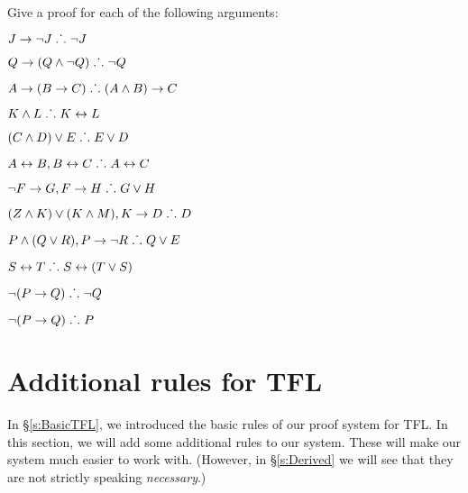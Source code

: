 \solutions
\problempart
\label{pr.solvedTFLproofs}
Give a proof for each of the following arguments:
\begin{earg}
\item $J\rightarrow\neg J \mathrel{\ldotp\dot{}\,\ldotp} \neg J$
\item $Q\rightarrow(Q\wedge\neg Q) \mathrel{\ldotp\dot{}\,\ldotp} \neg Q$
\item $A\rightarrow (B\rightarrow C) \mathrel{\ldotp\dot{}\,\ldotp} (A\wedge B)\rightarrow C$
\item $K\wedge L \mathrel{\ldotp\dot{}\,\ldotp} K\leftrightarrow L$
\item $(C\wedge D)\vee E \mathrel{\ldotp\dot{}\,\ldotp} E\vee D$
\item $A\leftrightarrow B, B\leftrightarrow C \mathrel{\ldotp\dot{}\,\ldotp} A\leftrightarrow C$
\item $\neg F\rightarrow G, F\rightarrow H \mathrel{\ldotp\dot{}\,\ldotp} G\vee H$
\item $(Z\wedge K) \vee (K\wedge M), K \rightarrow D \mathrel{\ldotp\dot{}\,\ldotp} D$
\item $P \wedge (Q\vee R), P\rightarrow \neg R \mathrel{\ldotp\dot{}\,\ldotp} Q\vee E$
\item $S\leftrightarrow T \mathrel{\ldotp\dot{}\,\ldotp} S\leftrightarrow (T\vee S)$
\item $\neg (P \rightarrow Q) \mathrel{\ldotp\dot{}\,\ldotp} \neg Q$
\item $\neg (P \rightarrow Q) \mathrel{\ldotp\dot{}\,\ldotp} P$
\end{earg}


\chapter{Additional rules for TFL}\label{s:Further}
In \S\ref{s:BasicTFL}, we introduced the basic rules of our proof system for TFL. In this section, we will add some additional rules to our system. These will make our system much easier to work with. (However, in \S\ref{s:Derived} we will see that they are not strictly speaking \emph{necessary}.)

%

